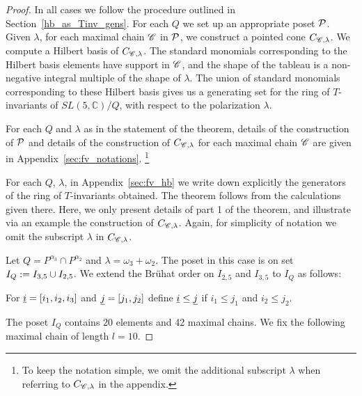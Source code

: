 \begin{proof}
    In all cases we follow the procedure outlined in Section~\ref{hb_as_Tinv_gens}. For each $Q$ we set up an appropriate poset ${\cal P}$. Given $\lambda$, for each maximal chain $\mathscr{C}$ in ${\cal P}$, we construct a pointed cone $C_{\mathscr{C}, \lambda}$. We compute a Hilbert basis of $C_{\mathscr{C}, \lambda}$.  The standard monomials corresponding to the Hilbert basis elements have support in $\mathscr{C}$, and the shape of the tableau is a non-negative integral multiple of the shape of $\lambda$. The union of standard monomials corresponding to these Hilbert basis gives us a generating set for the ring of $T$-invariants of $SL(5, \mathbb{C})/Q$, with respect to the polarization $\lambda$. 
    
For each $Q$ and $\lambda$ as in the statement of the theorem, details of the construction of ${\cal P}$ and details of the construction of  $C_{\mathscr{C}, \lambda}$ for each maximal chain $\mathscr{C}$ are given in Appendix~\ref{sec:fv_notations}. \footnote{To keep the notation simple, we omit the additional subscript $\lambda$ when referring to $C_{\mathscr{C}, \lambda}$ in the appendix.}
    
For each $Q$, $\lambda$, in Appendix~\ref{sec:fv_hb} we write down explicitly the generators of the ring of $T$-invariants obtained. The theorem follows from the calculations given there. Here, we only present details of part 1 of the theorem, and illustrate via an example the construction of $C_{\mathscr{C}, \lambda}$. Again, for simplicity of notation we omit the subscript $\lambda$ in  $C_{\mathscr{C}, \lambda}$.

 Let \(Q = P^{\alpha_3} \cap P^{\alpha_2}\) and \(\lambda = \omega_3 + \omega_2\). The poset in this case is on set \(I_{Q} := I_{3,5}\cup I_{2,5}\).
    We extend the Br\"{u}hat order on \(I_{2,5}\) and \(I_{3,5}\) to \(I_{Q}\) as follows:
\begin{center}
    For ${\underline i}=[i_1,i_2,i_3]$ and ${\underline j}=[j_1,j_2]$ define ${\underline i} \leq {\underline j}$ if $i_1 \leq j_1$ and $i_2 \leq j_2$.
\end{center}
    The poset \(I_{Q}\) contains 20 elements and 42 maximal chains.
    We fix the following maximal chain of length \(l=10\).
    

\end{proof}
